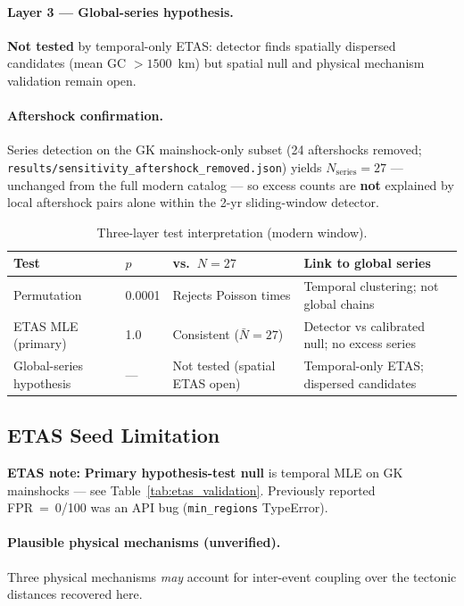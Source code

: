 \documentclass[draft]{agujournal2019}
\begin{document}
\paragraph{Layer 3 --- Global-series hypothesis.}
\textbf{Not tested} by temporal-only ETAS: detector finds spatially dispersed
candidates (mean GC $> 1500$~km) but spatial null and physical mechanism
validation remain open.

\paragraph{Aftershock confirmation.}
Series detection on the GK mainshock-only subset (24 aftershocks removed;
\texttt{results/sensitivity\_aftershock\_removed.json}) yields
$N_\mathrm{series}=27$ --- unchanged from the full modern catalog ---
so excess counts are \textbf{not} explained by local aftershock pairs alone
within the 2-yr sliding-window detector.

\begin{table}[htbp]
\centering
\caption{Three-layer test interpretation (modern window).}
\label{tab:etas_decision}
\small
\begin{tabular}{p{3.0cm}p{2.0cm}p{2.5cm}p{5.5cm}}
\hline
\textbf{Test} & \textbf{$p$} & \textbf{vs.\ $N=27$} & \textbf{Link to global series} \\
\hline
Permutation & 0.0001 & Rejects Poisson times & Temporal clustering; not global chains \\
ETAS MLE (primary) & 1.0 & Consistent ($\bar{N}=27$) & Detector vs calibrated null; no excess series \\
Global-series hypothesis & --- & Not tested (spatial ETAS open) & Temporal-only ETAS; dispersed candidates \\
\hline
\end{tabular}
\end{table}

\subsection{ETAS Seed Limitation}
\label{subsec:etas_seed}

\textbf{ETAS note:} \textbf{Primary hypothesis-test null} is temporal MLE on
GK mainshocks --- see Table~\ref{tab:etas_validation}.
Previously reported FPR~=~0/100 was an API bug (\texttt{min\_regions} TypeError).

\paragraph{Plausible physical mechanisms (unverified).}
Three physical mechanisms \emph{may} account for inter-event
coupling over the tectonic distances recovered here.
\end{document}
